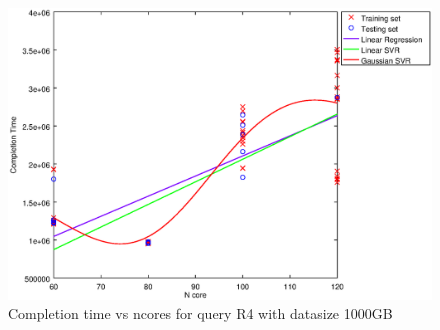 
\begin {figure}[hbtp]
\centering
\includegraphics[width=\textwidth]{output/R4_1000_ONLY_1_LINEAR_NCORE/plot_R4_1000_bestmodels.eps}
\caption{Completion time vs ncores for query R4 with datasize 1000GB}
\label{fig:only_1_linear_R4_1000}
\end {figure}
